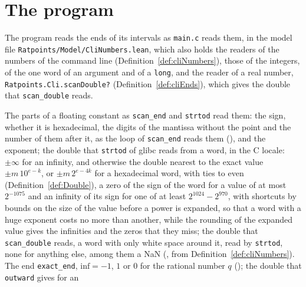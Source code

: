 \section{The program}\label{sec:regionCli}

The program reads the ends of its intervals as \verb|main.c| reads them, in the model file
\verb|Ratpoints/Model/CliNumbers.lean|, which also holds the readers of the numbers of the command
line (Definition~\ref{def:cliNumbers}), those of the integers, of the one word of an argument and of
a \verb|long|, and the reader of a real number, \verb|Ratpoints.Cli.scanDouble?|
(Definition~\ref{def:cliEnds}), which gives the double that \verb|scan_double| reads.

\begin{definition}\label{def:cliEnds}
  \leanok
  The parts of a floating constant as \verb|scan_end| and \verb|strtod| read them: the sign, whether
  it is hexadecimal, the digits of the mantissa without the point and the number of them after it,
  as the loop of \verb|scan_end| reads them (), and the exponent; the
  double that \verb|strtod| of glibc reads from a word, in the C locale: $\pm\infty$ for an
  infinity, and otherwise the double nearest to the exact value $\pm m\,10^{e - k}$, or
  $\pm m\,2^{e - 4k}$ for a hexadecimal word, with ties to even (Definition~\ref{def:Double}), a
  zero of the sign of the word for a value of at most $2^{-1075}$ and an infinity of its sign for
  one of at least $2^{1024} - 2^{970}$, with shortcuts by bounds on the size of the value before a
  power is expanded, so that a word with a huge exponent costs no more than another, while the
  rounding of the expanded value gives the infinities and the zeros that they miss; the double that
  \verb|scan_double| reads, a word with only white space around it, read by \verb|strtod|, none for
  anything else, among them a NaN (, from
  Definition~\ref{def:cliNumbers}). The end \verb|exact_end|, $\mathrm{inf} = -1$, $1$ or $0$ for
  the rational number $q$ (); the double that \verb|outward| gives for an

\end{definition}
